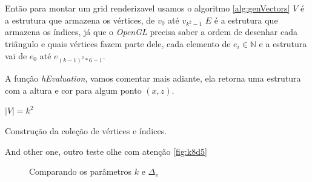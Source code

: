 Então para montar um grid renderizavel usamos o algoritmo \ref{alg:genVectors}
$V$ é a estrutura que armazena os vértices, de $v_{0}$ até $v_{k^2-1}$ 
$E$ é a estrutura que armazena os índices, já que o \textit{OpenGL} precisa
saber a ordem de desenhar cada triângulo e quais vértices fazem parte dele, 
cada elemento de $e_{i} \in \mathbb{N}$ e a estrutura vai de $e_{0}$ até $e_{(k-1)^2 * 6 - 1}$.

A função \textit{hEvaluation}, vamos comentar mais adiante, ela retorna uma estrutura
com a altura e cor para algum ponto $(x, z)$.
 
\begin{algorithm}[H]\label{alg:genVectors}
    $|V| = k^2$\;
    
    \caption{Construção da coleção de vértices e índices.}
\end{algorithm}

And other one, outro teste olhe com atenção \ref{fig:k8d5}

\begin{figure}[H]
     \centering
     \hspace{0.1cm}
     \hspace{0.1cm}
     \caption{Comparando os parâmetros $k$ e $\Delta_{v}$}
     \label{fig:parametrosGrid}
\end{figure}


